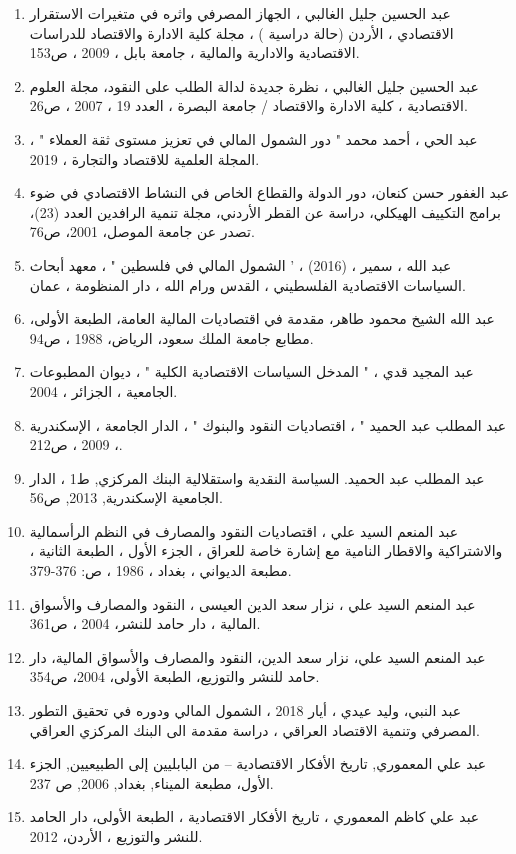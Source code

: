 \documentclass[10pt,a4paper]{report}
\begin{document}
\begin{enumerate}
	    \item عبد الحسين جليل الغالبي ، الجهاز المصرفي واثره في متغيرات الاستقرار الاقتصادي ، الأردن (حالة دراسية ) ، مجلة كلية الادارة والاقتصاد للدراسات الاقتصادية والادارية والمالية ، جامعة بابل ، 2009 ، ص153.
	\item عبد الحسين جليل الغالبي ، نظرة جديدة لدالة الطلب على النقود، مجلة العلوم الاقتصادية ، كلية الادارة والاقتصاد / جامعة البصرة ، العدد 19 ، 2007 ، ص26.
	\item عبد الحي ، أحمد محمد " دور الشمول المالي في تعزيز مستوى ثقة العملاء " ، المجلة العلمية للاقتصاد والتجارة ، 2019.
	\item عبد الغفور حسن كنعان، دور الدولة والقطاع الخاص في النشاط الاقتصادي في ضوء برامج التكييف الهيكلي، دراسة عن القطر الأردني، مجلة تنمية الرافدين العدد (23)، تصدر عن جامعة الموصل، 2001، ص76.
	\item عبد الله ، سمير ، (2016) ، ' الشمول المالي في فلسطين " ، معهد أبحاث السياسات الاقتصادية الفلسطيني ، القدس ورام الله ، دار المنظومة ، عمان.
	\item عبد الله الشيخ محمود طاهر، مقدمة في اقتصاديات المالية العامة، الطبعة الأولى، مطابع جامعة الملك سعود، الرياض، 1988 ، ص94.
	\item عبد المجيد قدي ، " المدخل السياسات الاقتصادية الكلية " ، ديوان المطبوعات الجامعية ، الجزائر ، 2004.
	\item عبد المطلب عبد الحميد " ، اقتصاديات النقود والبنوك " ، الدار الجامعة ، الإسكندرية ، 2009 ، ص212.
	\item عبد المطلب عبد الحميد. السياسة النقدية واستقلالية البنك المركزي, ط1 ، الدار الجامعية الإسكندرية, 2013, ص56.
	\item عبد المنعم السيد علي ، اقتصاديات النقود والمصارف في النظم الرأسمالية والاشتراكية والاقطار النامية مع إشارة خاصة للعراق ، الجزء الأول ، الطبعة الثانية ، مطبعة الديواني ، بغداد ، 1986 ، ص: 376-379.
	\item عبد المنعم السيد علي ، نزار سعد الدين العيسى ، النقود والمصارف والأسواق المالية ، دار حامد للنشر، 2004 ، ص361.
	\item عبد المنعم السيد علي، نزار سعد الدين، النقود والمصارف والأسواق المالية، دار حامد للنشر والتوزيع، الطبعة الأولى، 2004، ص354.
	\item عبد النبي، وليد عيدي ، أيار 2018 ، الشمول المالي ودوره في تحقيق التطور المصرفي وتنمية الاقتصاد العراقي ، دراسة مقدمة الى البنك المركزي العراقي.
	\item عبد علي المعموري, تاريخ الأفكار الاقتصادية – من البابليين إلى الطبيعيين, الجزء الأول، مطبعة الميناء, بغداد, 2006, ص 237.
	\item عبد علي كاظم المعموري ، تاريخ الأفكار الاقتصادية ، الطبعة الأولى، دار الحامد للنشر والتوزيع ، الأردن، 2012.

\end{enumerate}
\end{document}
